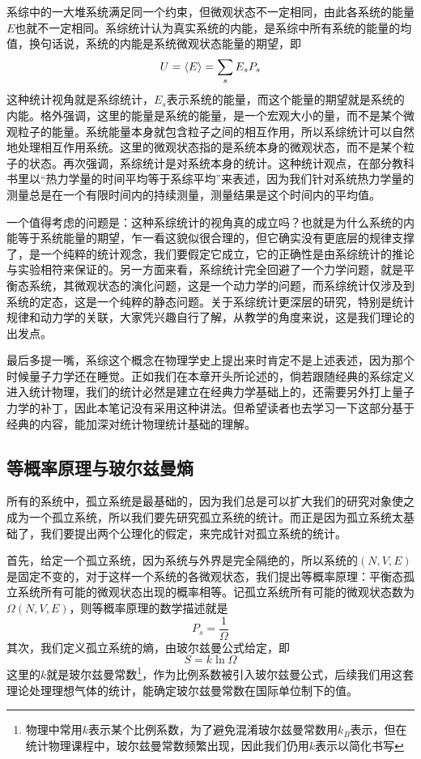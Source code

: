 \documentclass[../../main.tex]{subfiles}
\begin{document}
系综中的一大堆系统满足同一个约束，但微观状态不一定相同，由此各系统的能量\(E\)也就不一定相同。系综统计认为真实系统的内能，是系综中所有系统的能量的均值，换句话说，系统的内能是系统微观状态能量的期望，即
\begin{equation}
    U=\expval{E}=\sum_s E_sP_s
\end{equation}
这种统计视角就是系综统计，\(E_s\)表示系统的能量，而这个能量的期望就是系统的内能。格外强调，这里的能量是系统的能量，是一个宏观大小的量，而不是某个微观粒子的能量。系统能量本身就包含粒子之间的相互作用，所以系综统计可以自然地处理相互作用系统。这里的微观状态指的是系统本身的微观状态，而不是某个粒子的状态。再次强调，系综统计是对系统本身的统计。这种统计观点，在部分教科书里以“热力学量的时间平均等于系综平均”来表述，因为我们针对系统热力学量的测量总是在一个有限时间内的持续测量，测量结果是这个时间内的平均值。

一个值得考虑的问题是：这种系综统计的视角真的成立吗？也就是为什么系统的内能等于系统能量的期望，乍一看这貌似很合理的，但它确实没有更底层的规律支撑了，是一个纯粹的统计观念，我们要假定它成立，它的正确性是由系综统计的推论与实验相符来保证的。另一方面来看，系综统计完全回避了一个力学问题，就是平衡态系统，其微观状态的演化问题，这是一个动力学的问题，而系综统计仅涉及到系统的定态，这是一个纯粹的静态问题。关于系综统计更深层的研究，特别是统计规律和动力学的关联，大家凭兴趣自行了解，从教学的角度来说，这是我们理论的出发点。

最后多提一嘴，系综这个概念在物理学史上提出来时肯定不是上述表述，因为那个时候量子力学还在睡觉。正如我们在本章开头所论述的，倘若跟随经典的系综定义进入统计物理，我们的统计必然是建立在经典力学基础上的，还需要另外打上量子力学的补丁，因此本笔记没有采用这种讲法。但希望读者也去学习一下这部分基于经典的内容，能加深对统计物理统计基础的理解。

\subsection{等概率原理与玻尔兹曼熵}

所有的系统中，孤立系统是最基础的，因为我们总是可以扩大我们的研究对象使之成为一个孤立系统，所以我们要先研究孤立系统的统计。而正是因为孤立系统太基础了，我们要提出两个公理化的假定，来完成针对孤立系统的统计。

首先，给定一个孤立系统，因为系统与外界是完全隔绝的，所以系统的\(\left(N,V,E\right)\)是固定不变的，对于这样一个系统的各微观状态，我们提出等概率原理：平衡态孤立系统所有可能的微观状态出现的概率相等。记孤立系统所有可能的微观状态数为\(\Omega(N,V,E)\)，则等概率原理的数学描述就是
\begin{equation}
    P_s=\frac{1}{\Omega}
\end{equation}
其次，我们定义孤立系统的熵，由玻尔兹曼公式给定，即
\begin{equation}
    S=k\ln \Omega
\end{equation}
这里的\(k\)就是玻尔兹曼常数\footnote{物理中常用\(k\)表示某个比例系数，为了避免混淆玻尔兹曼常数用\(k_B\)表示，但在统计物理课程中，玻尔兹曼常数频繁出现，因此我们仍用\(k\)表示以简化书写}，作为比例系数被引入玻尔兹曼公式，后续我们用这套理论处理理想气体的统计，能确定玻尔兹曼常数在国际单位制下的值。
\end{document}
